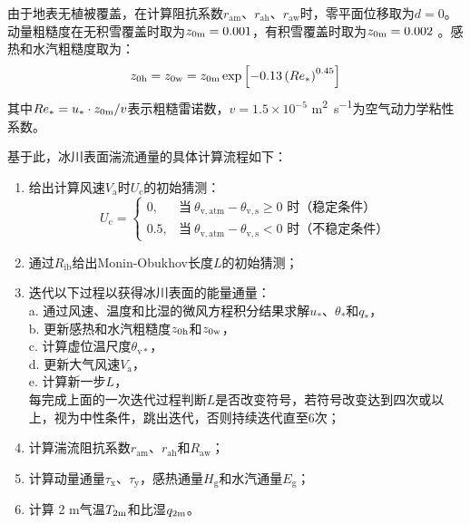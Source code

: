 由于地表无植被覆盖，在计算阻抗系数$r_{\mathrm{am}}$、$r_{\mathrm{ah}}$、$r_{\mathrm{aw}}$时，零平面位移取为$d=0$。动量粗糙度在无积雪覆盖时取为$z_{\rm 0m}=0.001$，有积雪覆盖时取为$z_{\rm 0m}=0.002$ \citep{brock_willis_sharp_2006}。感热和水汽粗糙度取为：
\begin{equation}z_{\rm 0h}=z_{\rm 0w}=z_{\rm 0m}\exp{\left[-0.13\left(Re_*\right)^{0.45}\right]}
\end{equation}
其中$Re_*=u_*\cdot z_{\rm 0m}/v$表示粗糙雷诺数，$v= 1.5 \times 10^{-5}$ \unit{m^2.s^{-1}}为空气动力学粘性系数。

基于此，冰川表面湍流通量的具体计算流程如下：
\begin{enumerate}
  \item 给出计算风速$V_{\mathrm {a}} $时$U_{\mathrm {c}} $的初始猜测：
    \begin{equation}
      U_{\mathrm {c}}  = \begin{cases}
        0, &\text{当}\ \theta_{\mathrm{v,atm}}-\theta_{\mathrm{v,s}} \geqslant 0 \text{ 时（稳定条件）} \\
        0.5, &\text{当}\ \theta_{\mathrm{v,atm}}-\theta_{\mathrm{v,s}} < 0 \text{ 时（不稳定条件）}
      \end{cases}
    \end{equation}
  \item 通过$R_{\mathrm{ib}}$给出Monin-Obukhov长度$L$的初始猜测；
  \item 迭代以下过程以获得冰川表面的能量通量：\\
    a. 通过风速、温度和比湿的微风方程积分结果求解$u_*$、$\theta_*$和$q_*$，\\
    b. 更新感热和水汽粗糙度$z_{\rm 0h}$和$z_{\rm 0w}$，\\
    c. 计算虚位温尺度$\theta_{\mathrm{v*}}$，\\
    d. 更新大气风速$V_{\mathrm {a}} $，\\
    e. 计算新一步$L$，\\
    每完成上面的一次迭代过程判断$L$是否改变符号，若符号改变达到四次或以上，视为中性条件，跳出迭代，否则持续迭代直至6次；
  \item 计算湍流阻抗系数$r_{\mathrm{am}}$、$r_{\mathrm{ah}}$和$R_{\mathrm{aw}}$；
  \item 计算动量通量$\tau_{\mathrm {x}} $、$\tau_{\mathrm {y}} $，感热通量$H_{\mathrm {g}} $和水汽通量$E_{\mathrm {g}} $；
  \item 计算 2 m气温$T_{\rm 2m}$和比湿$q_{\rm 2m}$。
\end{enumerate}

